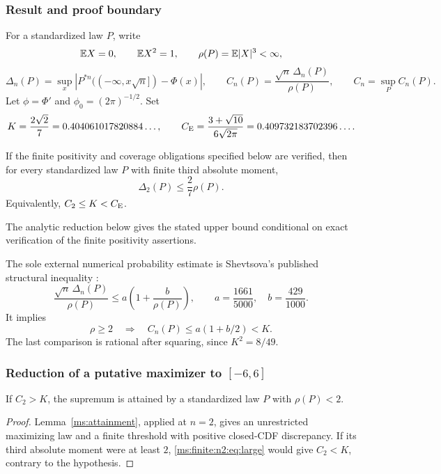 \subsubsection{Result and proof boundary}
For a standardized law $P$, write
\[
 \mathbb E X=0,\qquad \mathbb E X^2=1,\qquad \rho(P)=\mathbb E|X|^3<\infty,
\]
\[
 \Delta_n(P)=\sup_x\left|P^{*n}(( -\infty,x\sqrt n])-\Phi(x)\right|,
 \qquad C_n(P)=\frac{\sqrt n\,\Delta_n(P)}{\rho(P)},\qquad C_n=\sup_P C_n(P).
\]
Let $\phi=\Phi'$ and $\phi_0=(2\pi)^{-1/2}$. Set
\[
 K=\frac{2\sqrt2}{7}=0.404061017820884\ldots,
 \qquad C_{\mathrm E}=\frac{3+\sqrt{10}}{6\sqrt{2\pi}}=0.409732183702396\ldots.
\]
\begin{theorem}\label{ms:finite:n2:thm:main}
If the finite positivity and coverage obligations specified below are
verified, then for every standardized law $P$ with finite third absolute moment,
\[
 \boxed{\Delta_2(P)\le\frac27\rho(P).}
\]
Equivalently, $C_2\le K<C_{\mathrm E}$.
\end{theorem}
The analytic reduction below gives the stated upper bound conditional on
exact verification of the finite positivity assertions.

The sole external numerical probability estimate is Shevtsova's published
structural inequality \cite{Shevtsova2013}:
\begin{equation}\label{ms:finite:n2:eq:struct}
 \frac{\sqrt n\,\Delta_n(P)}{\rho(P)}
 \le a\left(1+\frac b{\rho(P)}\right),
 \qquad a=\frac{1661}{5000},\quad b=\frac{429}{1000}.
\end{equation}
It implies
\begin{equation}\label{ms:finite:n2:eq:large}
 \rho\ge2\quad\Longrightarrow\quad
 C_n(P)\le a(1+b/2)<K.
\end{equation}
The last comparison is rational after squaring, since $K^2=8/49$.

\subsubsection{Reduction of a putative maximizer to \texorpdfstring{$[-6,6]$}{[-6,6]}}
\begin{lemma}\label{ms:finite:n2:lem:attain}
If $C_2>K$, the supremum is attained by a standardized law $P$ with $\rho(P)<2$.
\end{lemma}
\begin{proof}
Lemma~\ref{ms:attainment}, applied at $n=2$, gives an unrestricted
maximizing law and a finite threshold with positive closed-CDF discrepancy. If its third
absolute moment were at least $2$, \eqref{ms:finite:n2:eq:large}
would give $C_2<K$, contrary to the hypothesis.
\end{proof}

